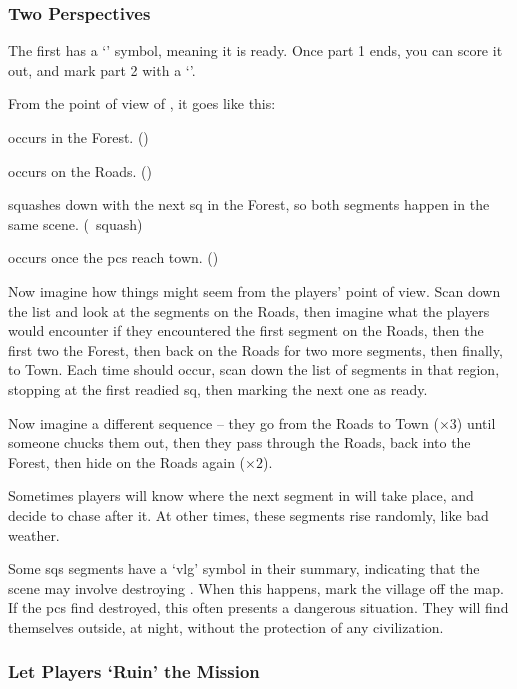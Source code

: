 \begin{multicols}{2}
\subsubsection{Two Perspectives}

The first has a `\sqr' symbol, meaning it is ready.
Once part 1 ends, you can score it out, and mark part 2 with a `\sqr'.

From the point of view of , it goes like this:

\begin{list}{\scshape Part }{}
  \item
  occurs in the Forest. (\sqr)
  \item
  occurs on the Roads. (\sqn)
  \item
  squashes down with the next \gls{sq} in the Forest, so both \glspl{segment} happen in the same scene. (\sqn~\gls{squash})
  \item
  occurs once the \glspl{pc} reach town. (\sqn)
\end{list}


Now imagine how things might seem from the players' point of view.
Scan down the list  and look at the \glspl{segment} on the Roads, then imagine what the players would encounter if they encountered the first \gls{segment} on the Roads, then the first two the Forest, then back on the Roads for two more \glspl{segment}, then finally, to Town.
Each time  should occur, scan down the list of \glspl{segment} in that region, stopping at the first readied \gls{sq}, then marking the next one as ready.

Now imagine a different sequence -- they go from the Roads to Town ($\times 3$) until someone chucks them out, then they pass through the Roads, back into the Forest, then hide on the Roads again ($\times 2$).

Sometimes players will know where the next \gls{segment} in  will take place, and decide to chase after it.
At other times, these \glspl{segment} rise randomly, like bad weather.

Some \glspl{sq} \glspl{segment} have a `\gls{vlg}' symbol in their summary, indicating that the scene may involve destroying .
When this happens, mark the \gls{village} off the map.
If the \glspl{pc} find  destroyed, this often presents a dangerous situation.
They will find themselves outside, at night, without the protection of any civilization.

\subsubsection{Let Players `Ruin' the Mission}


\end{multicols}
